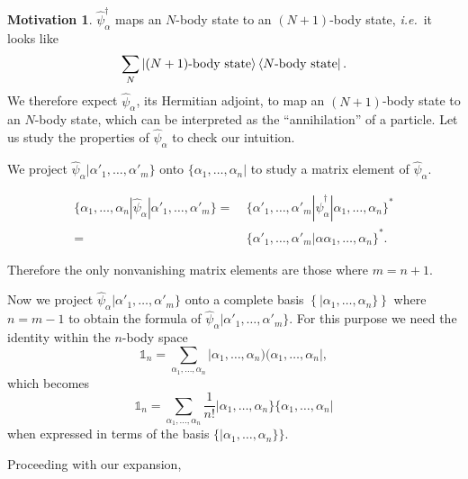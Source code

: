 \documentclass{article}
\theoremstyle{definition}
\newtheorem{mot}{Motivation}[section]
\theoremstyle{plain}
\numberwithin{equation}{section}
\begin{document}
\begin{mot}
    $\hat{\psi}^{\dagger}_{\alpha}$
    maps an $N$-body state to an $(N+1)$-body 
    state, \textit{i.e.}~it looks like 
    \[
      \sum_{N}\ket{(N+1)\text{-body state}}\bra{N\text{-body state}}.
    \]
    We therefore expect 
    $\hat{\psi}_{\alpha}$, its Hermitian adjoint, 
    to map an $(N+1)$-body state 
    to an $N$-body state, 
    which can be interpreted as the 
    ``annihilation'' of a particle. 
    Let us study the properties of 
    $\hat{\psi}_{\alpha}$ 
    to check our intuition.
\end{mot}

We project 
$\hat{\psi}_{\alpha} |\alpha'_{1}, \ldots ,\alpha'_{m}\}$
onto $\{\alpha_1, \ldots ,\alpha_{n}|$ to 
study a matrix element of $\hat{\psi}_{\alpha}$. 

\begin{align*}
    \{ \alpha_1, \ldots ,\alpha_{n}
    |\hat{\psi}_{\alpha}|
    \alpha'_{1}, \ldots ,\alpha'_{m}\}
    =&\ 
    \{ \alpha'_{1}, \ldots ,\alpha'_{m} |
    \hat{\psi}^{\dagger}_{\alpha}|
    \alpha_1, \ldots ,\alpha_{n}\}
    ^{*}
    \\
    =&\ 
    \{\alpha'_{1}, \ldots ,\alpha'_{m}
    |
    \alpha \alpha_{1}, \ldots ,\alpha_{n}\}
    ^{*}.
\end{align*}

Therefore the only nonvanishing matrix elements 
are those where $m=n+1$.

Now we project 
$\hat{\psi}_{\alpha}|\alpha'_{1}, \ldots ,\alpha'_{m}\}$ 
onto a complete basis $\left\{ |\alpha_1, \ldots ,\alpha_n\} \right\}$ 
where $n=m-1$ 
to obtain the formula of 
$\hat{\psi}_{\alpha}|\alpha'_{1}, \ldots ,\alpha'_{m}\}$.
For this purpose we need 
the identity within the $n$-body space 
\[
    \mathds{1}_{n}
    =
    \sum_{\alpha_1, \ldots ,\alpha_{n}}
    |\alpha_1, \ldots ,\alpha_{n})(\alpha_1, \ldots ,\alpha_{n}|, 
\]
which becomes 
\[
    \mathds{1}_{n}
    =
    \sum_{\alpha_1, \ldots ,\alpha_{n}}
    \frac{1}{n!}
    |\alpha_1, \ldots ,\alpha_{n}\}
    \{\alpha_1, \ldots ,\alpha_{n}|
\]
when expressed in terms of the basis 
$\{|\alpha_1, \ldots ,\alpha_{n}\}\}$.

Proceeding with our expansion, 
\end{document}

